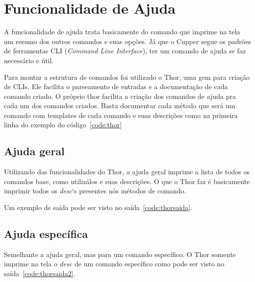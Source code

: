\section{Funcionalidade de Ajuda}
\label{sec:help}

A funcionalidade de ajuda trata basicamente do comando que imprime na tela um resumo
dos outros comandos e suas opções. Já que o Cupper segue os padrões de ferramentas
CLI (\textit{Command Line Interface}), ter um comando de ajuda se faz necessário
e útil.

Para montar a estrutura de comandos foi utilizado o Thor, uma gem para criação
de CLIs. Ele facilita o parseamento de entradas e a documentação de cada comando criado.
O próprio thor facilita a criação dos comandos de ajuda pra cada um dos comandos
criados. Basta documentar cada método que será um comando com templates de cada
comando e suas descrições como na primeira linha do exemplo do código~\ref{code:thor}

\noindent\begin{minipage}{\textwidth}
  
\end{minipage}\hfill

\subsection{Ajuda geral}
Utilizando das funcionalidades do Thor, a ajuda geral imprime a lista de todos
os comandos base, como utilizálos e suas descrições. O que o Thor faz é basicamente
imprimir todos os \textit{desc}`s presentes nós métodos de comando.

Um exemplo de saída pode ser visto no saída~\ref{code:thorsaida}.

\noindent\begin{minipage}{\textwidth}
  
\end{minipage}\hfill


\subsection{Ajuda específica}
Semelhante a ajuda geral, mas para um comando específico. O Thor somente imprime
na tela o \textit{desc} de um comando específico como pode ser visto no 
saída~\ref{code:thorsaida2}.

\noindent\begin{minipage}{\textwidth}
  
\end{minipage}\hfill
